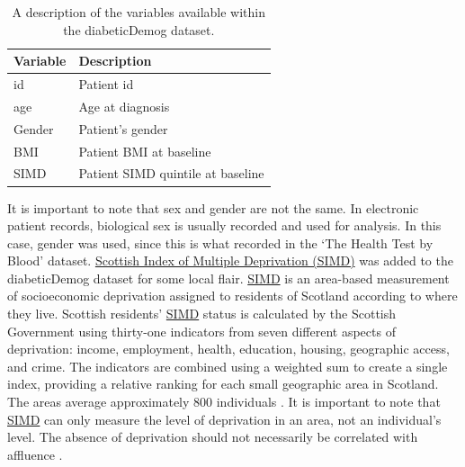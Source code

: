 \documentclass[
]{book}
\begin{document}
\begin{table}

\caption{\label{tab:diabeticDemog}A description of the variables available within the diabeticDemog dataset.}
\centering
\begin{tabular}[t]{l|l}
\hline
Variable & Description\\
\hline
id & Patient id\\
\hline
age & Age at diagnosis\\
\hline
Gender & Patient's gender\\
\hline
BMI & Patient BMI at baseline\\
\hline
SIMD & Patient SIMD quintile at baseline\\
\hline
\end{tabular}
\end{table}

It is important to note that sex and gender are not the same. In electronic
patient records, biological sex is usually recorded and used for analysis. In
this case, gender was used, since this is what \citet{kaggleDM} recorded in the `The
Health Test by Blood' dataset. \hyperref[acronyms_SIMD]{Scottish Index of Multiple Deprivation (SIMD)} was added to the diabeticDemog dataset
for some local flair. \hyperref[acronyms_SIMD]{SIMD} is an area-based measurement of socioeconomic
deprivation assigned to residents of Scotland according to where they live.
Scottish residents' \hyperref[acronyms_SIMD]{SIMD} status is calculated by the Scottish Government
using thirty-one indicators from seven different aspects of deprivation: income,
employment, health, education, housing, geographic access, and crime. The
indicators are combined using a weighted sum to create a single index, providing
a relative ranking for each small geographic area in Scotland. The areas average
approximately 800 individuals \citep{Executive2012}. It is important to note that
\hyperref[acronyms_SIMD]{SIMD} can only measure the level of deprivation in an area, not an
individual's level. The absence of deprivation should not necessarily be
correlated with affluence \citep{Executive2012}.
\end{document}
